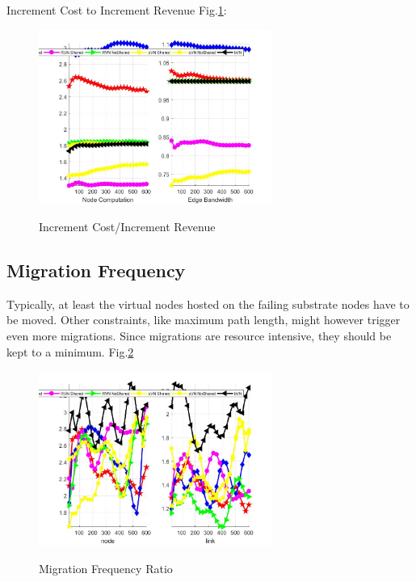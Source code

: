 Increment Cost to Increment Revenue Fig.\ref{fig:CostRevenueAccumulate}:
\begin{figure}
  \centering
  \includegraphics[width=3in]{Fig/CostRevenueAccumulate}\\
  \caption{Increment Cost/Increment Revenue}\label{fig:CostRevenueAccumulate}
\end{figure}



\subsection{Migration Frequency}
Typically, at least the virtual nodes hosted on the failing substrate nodes have to be moved. Other constraints, like maximum path length, might however trigger even more migrations. Since migrations are resource intensive, they should be kept to a minimum.
Fig.\ref{fig:MigrationFrequence}
\begin{figure}
  \centering
  \includegraphics[width=3in]{Fig/MigrationFrequence}\\
  \caption{Migration Frequency Ratio}\label{fig:MigrationFrequence}
\end{figure}


